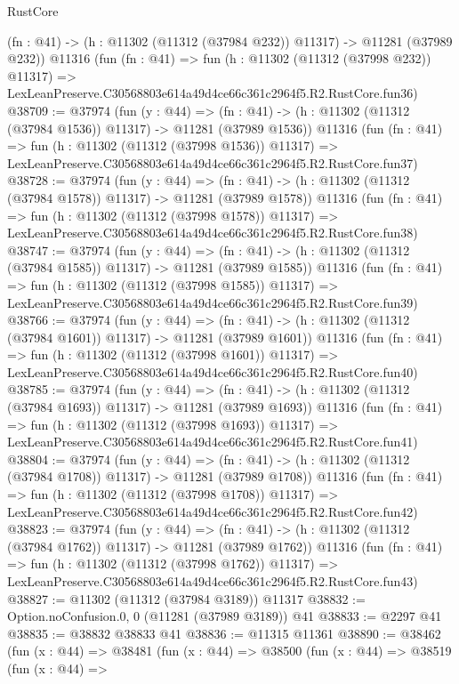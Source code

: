 \begin{lexlean}{RustCore}
\begin{coremodule}
    (fn : @41) -> (h : @11302 (@11312 (@37984 @232)) @11317) -> @11281 (@37989 @232))
    @11316
    (fun (fn : @41) =>
    fun (h : @11302 (@11312 (@37998 @232)) @11317) =>
    LexLeanPreserve.C30568803e614a49d4ce66c361c2964f5.R2.RustCore.fun36)
@38709 := @37974
    (fun (y : @44) =>
    (fn : @41) -> (h : @11302 (@11312 (@37984 @1536)) @11317) -> @11281 (@37989 @1536))
    @11316
    (fun (fn : @41) =>
    fun (h : @11302 (@11312 (@37998 @1536)) @11317) =>
    LexLeanPreserve.C30568803e614a49d4ce66c361c2964f5.R2.RustCore.fun37)
@38728 := @37974
    (fun (y : @44) =>
    (fn : @41) -> (h : @11302 (@11312 (@37984 @1578)) @11317) -> @11281 (@37989 @1578))
    @11316
    (fun (fn : @41) =>
    fun (h : @11302 (@11312 (@37998 @1578)) @11317) =>
    LexLeanPreserve.C30568803e614a49d4ce66c361c2964f5.R2.RustCore.fun38)
@38747 := @37974
    (fun (y : @44) =>
    (fn : @41) -> (h : @11302 (@11312 (@37984 @1585)) @11317) -> @11281 (@37989 @1585))
    @11316
    (fun (fn : @41) =>
    fun (h : @11302 (@11312 (@37998 @1585)) @11317) =>
    LexLeanPreserve.C30568803e614a49d4ce66c361c2964f5.R2.RustCore.fun39)
@38766 := @37974
    (fun (y : @44) =>
    (fn : @41) -> (h : @11302 (@11312 (@37984 @1601)) @11317) -> @11281 (@37989 @1601))
    @11316
    (fun (fn : @41) =>
    fun (h : @11302 (@11312 (@37998 @1601)) @11317) =>
    LexLeanPreserve.C30568803e614a49d4ce66c361c2964f5.R2.RustCore.fun40)
@38785 := @37974
    (fun (y : @44) =>
    (fn : @41) -> (h : @11302 (@11312 (@37984 @1693)) @11317) -> @11281 (@37989 @1693))
    @11316
    (fun (fn : @41) =>
    fun (h : @11302 (@11312 (@37998 @1693)) @11317) =>
    LexLeanPreserve.C30568803e614a49d4ce66c361c2964f5.R2.RustCore.fun41)
@38804 := @37974
    (fun (y : @44) =>
    (fn : @41) -> (h : @11302 (@11312 (@37984 @1708)) @11317) -> @11281 (@37989 @1708))
    @11316
    (fun (fn : @41) =>
    fun (h : @11302 (@11312 (@37998 @1708)) @11317) =>
    LexLeanPreserve.C30568803e614a49d4ce66c361c2964f5.R2.RustCore.fun42)
@38823 := @37974
    (fun (y : @44) =>
    (fn : @41) -> (h : @11302 (@11312 (@37984 @1762)) @11317) -> @11281 (@37989 @1762))
    @11316
    (fun (fn : @41) =>
    fun (h : @11302 (@11312 (@37998 @1762)) @11317) =>
    LexLeanPreserve.C30568803e614a49d4ce66c361c2964f5.R2.RustCore.fun43)
@38827 := @11302 (@11312 (@37984 @3189)) @11317
@38832 := Option.noConfusion.{0, 0} (@11281 (@37989 @3189)) @41
@38833 := @2297 @41
@38835 := @38832 @38833 @41
@38836 := @11315 @11361
@38890 := @38462
    (fun (x : @44) =>
    @38481
      (fun (x : @44) =>
      @38500
        (fun (x : @44) =>
        @38519
          (fun (x : @44) =>

\end{coremodule}
\end{lexlean}
